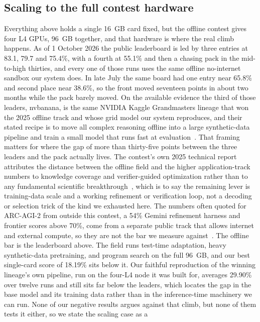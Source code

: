 \documentclass[11pt]{article}
\begin{document}
\subsection{Scaling to the full contest hardware}
\label{sec:scale}
Everything above holds a single 16~GB card fixed, but the offline contest gives four L4 GPUs, 96~GB
together, and that hardware is where the real climb happens. As of 1 October 2026 the public
leaderboard is led by three entries at 83.1, 79.7 and 75.4\%, with a fourth at 55.1\% and then a chasing
pack in the mid-to-high thirties, and every one of those runs uses the same offline no-internet sandbox
our system does. In late July the same board had one entry near 65.8\% and second place near 38.6\%, so
the front moved seventeen points in about two months while the pack barely moved. On the available
evidence the third of those leaders, nvbanana, is the same NVIDIA Kaggle Grandmasters lineage that won the 2025 offline
track and whose grid model our system reproduces, and their stated recipe is to move all complex reasoning
offline into a large synthetic-data pipeline and train a small model that runs fast at evaluation~\cite{arc2025}.
That framing matters for where the gap of more than thirty-five points between the three leaders and the pack actually lives. The contest's
own 2025 technical report attributes the distance between the offline field and the higher application-track
numbers to knowledge coverage and verifier-guided optimization rather than to any fundamental scientific
breakthrough~\cite{arc2025}, which is to say the remaining lever is training-data scale and a working
refinement or verification loop, not a decoding or selection trick of the kind we exhausted here. The
numbers often quoted for ARC-AGI-2 from outside this contest, a 54\% Gemini refinement harness and frontier scores above 70\%,
come from a separate public track that allows internet and external compute, so they are not the bar we
measure against~\cite{arc2025}. The offline bar is the leaderboard above. The field runs test-time
adaptation, heavy synthetic-data pretraining, and program search on the full 96~GB, and our best single-card
score of 18.19\% sits below it. Our faithful reproduction of the winning lineage's own pipeline, run on the
four-L4 node it was built for, averages 29.90\% over twelve runs and still sits far below the leaders, which locates the gap
in the base model and its training data rather than in the inference-time machinery we can run. None of our negative
results argues against that climb, but none of them tests it either, so we state the scaling case as a
\end{document}
